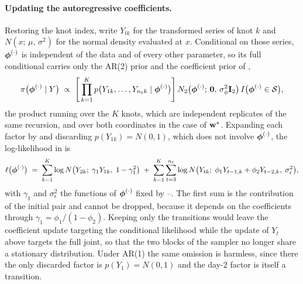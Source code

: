 \documentclass[12pt]{article}
\begin{document}
\paragraph{Updating the autoregressive coefficients.}
Restoring the knot index, write $Y_{tk}$ for the transformed series of knot $k$ and $N(x;\, \mu,\, \sigma^2)$ for the normal density evaluated at $x$.  Conditional on those series, $\mbox{\boldmath $\phi$}^{(\cdot)}$ is independent of the data and of every other parameter, so its full conditional carries only the AR(2) prior and the coefficient prior of ,
\begin{align}
  \pi\big(\mbox{\boldmath $\phi$}^{(\cdot)} \mid Y\big)
  \;\propto\;
  \Bigg[ \prod_{k=1}^{K} p\big(Y_{1k}, \ldots, Y_{n_t k} \mid \mbox{\boldmath $\phi$}^{(\cdot)}\big) \Bigg]\,
  N_2\big(\mbox{\boldmath $\phi$}^{(\cdot)};\, \mbox{\boldmath $0$},\, \sigma^2_\phi \mbox{\bf I}_2\big)\,
  I\big(\mbox{\boldmath $\phi$}^{(\cdot)} \in {\cal S}\big),
  \label{eq:phi-full-cond}
\end{align}
the product running over the $K$ knots, which are independent replicates of the same recursion, and over both coordinates in the case of $\mbox{\bf w}^*$.  Expanding each factor by  and discarding $p(Y_{1k}) = N(0, 1)$, which does not involve $\mbox{\boldmath $\phi$}^{(\cdot)}$, the log-likelihood in  is
\begin{align}
  \ell\big(\mbox{\boldmath $\phi$}^{(\cdot)}\big)
  \;=\;
  \sum_{k=1}^{K} \log N\big(Y_{2k};\; \gamma_1 Y_{1k},\; 1 - \gamma_1^2\big)
  \;+\;
  \sum_{k=1}^{K} \sum_{t=3}^{n_t}
    \log N\big(Y_{tk};\; \phi_1 Y_{t-1,k} + \phi_2 Y_{t-2,k},\; \sigma_\epsilon^2\big),
  \label{eq:phi-loglik}
\end{align}
with $\gamma_1$ and $\sigma_\epsilon^2$ the functions of $\mbox{\boldmath $\phi$}^{(\cdot)}$ fixed by --.  The first sum is the contribution of the initial pair and cannot be dropped, because it depends on the coefficients through $\gamma_1 = \phi_1 / (1 - \phi_2)$.  Keeping only the transitions would leave the coefficient update targeting the conditional likelihood while the update of $Y_t$ above targets the full joint, so that the two blocks of the sampler no longer share a stationary distribution.  Under AR(1) the same omission is harmless, since there the only discarded factor is $p(Y_1) = N(0, 1)$ and the day-$2$ factor is itself a transition.
\end{document}
